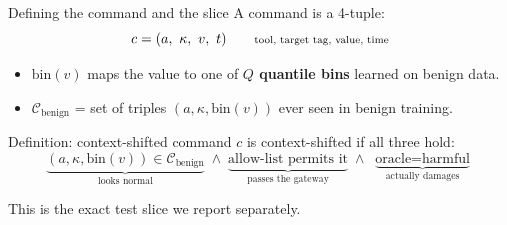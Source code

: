 \documentclass[aspectratio=169]{beamer}
\newcommand{\key}[1]{\textcolor{accent}{\textbf{#1}}}
\begin{document}
\begin{frame}{Defining the command and the slice}
A command is a 4-tuple:
\begin{equation*}
  c = (a,\ \kappa,\ v,\ t)
  \qquad\text{\scriptsize tool, target tag, value, time}
\end{equation*}
\vspace{-0.3em}
\begin{itemize}
  \item $\mathrm{bin}(v)$ maps the value to one of \key{$Q$ quantile bins}
        learned on benign data.
  \item $\mathcal{C}_{\text{benign}}$ = set of triples
        $(a,\kappa,\mathrm{bin}(v))$ ever seen in benign training.
\end{itemize}
\vspace{0.3em}
\begin{block}{Definition: context-shifted command}
$c$ is context-shifted if all three hold:
\[
\underbrace{(a,\kappa,\mathrm{bin}(v))\in\mathcal{C}_{\text{benign}}}_{\text{looks normal}}
\;\wedge\;
\underbrace{\text{allow-list permits it}}_{\text{passes the gateway}}
\;\wedge\;
\underbrace{\text{oracle} = \text{harmful}}_{\text{actually damages}}
\]
\end{block}
\centering\footnotesize\textcolor{muted}{This is the exact test slice we report separately.}
\end{frame}
\end{document}
